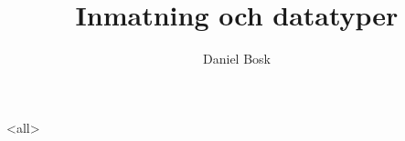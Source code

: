 \documentclass[ignoreframetext]{beamer}
\begin{document}
\title{%
  Inmatning och datatyper
}
\author{Daniel Bosk}

\begin{frame}
  \maketitle
\end{frame}

\mode<all>

\mode*
\end{document}
